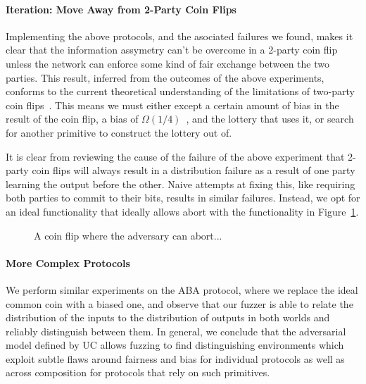 \paragraph{Iteration: Move Away from 2-Party Coin Flips}
Implementing the above protocols, and the asociated failures we found, makes it clear that the information assymetry can't be overcome in a 2-party coin flip unless the network can enforce some kind of fair exchange between the two parties.
This result, inferred from the outcomes of the above experiments, conforms to the current theoretical understanding of the limitations of two-party coin flips~\cite{two, party, coin, results}.
This means we must either except a certain amount of bias in the result of the coin flip, a bias of $\Omega (1/4)$~\cite{cleve, and the others}, and the lottery that uses it, or search for another primitive to construct the lottery out of. 


It is clear from reviewing the cause of the failure of the above experiment that 2-party coin flips will always result in a distribution failure as a result of one party learning the output before the other.
Naive attempts at fixing this, like requiring both parties to commit to their bits, results in similar failures.
Instead, we opt for an ideal functionality that ideally allows abort with the functionality in Figure~\ref{fig:fcoinabort}.

\begin{figure}
\centering

\caption{A coin flip where the adversary can abort...}
\label{fig:fcoinabort}
\end{figure}

\paragraph{More Complex Protocols}
We perform similar experiments on the ABA protocol, where we replace the ideal
common coin with a biased one, and observe that our fuzzer is able to relate
the distribution of the inputs to the distribution of outputs in both worlds
and reliably distinguish between them.  In general, we conclude that the
adversarial model defined by UC allows fuzzing to find distinguishing
environments which exploit subtle flaws around fairness and bias for individual
protocols as well as across composition for protocols that rely on such
primitives. 

\begin{figure*}
\centering

\end{figure*}


